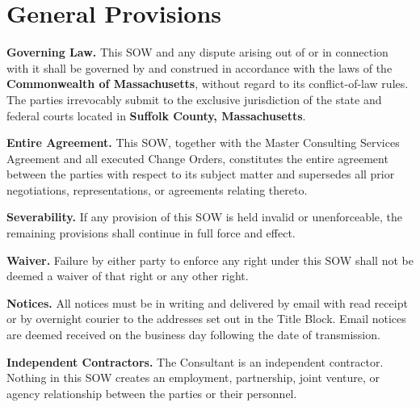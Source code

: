 \section{General Provisions}

\textbf{Governing Law.} This SOW and any dispute arising out of or in connection with
it shall be governed by and construed in accordance with the laws of the
\textbf{Commonwealth of Massachusetts}, without regard to its conflict-of-law rules.
The parties irrevocably submit to the exclusive jurisdiction of the state and federal
courts located in \textbf{Suffolk County, Massachusetts}.

\textbf{Entire Agreement.} This SOW, together with the Master Consulting Services
Agreement and all executed Change Orders, constitutes the entire agreement between the
parties with respect to its subject matter and supersedes all prior negotiations,
representations, or agreements relating thereto.

\textbf{Severability.} If any provision of this SOW is held invalid or unenforceable,
the remaining provisions shall continue in full force and effect.

\textbf{Waiver.} Failure by either party to enforce any right under this SOW shall
not be deemed a waiver of that right or any other right.

\textbf{Notices.} All notices must be in writing and delivered by email with read receipt
or by overnight courier to the addresses set out in the Title Block. Email notices are
deemed received on the business day following the date of transmission.

\textbf{Independent Contractors.} The Consultant is an independent contractor. Nothing
in this SOW creates an employment, partnership, joint venture, or agency relationship
between the parties or their personnel.
